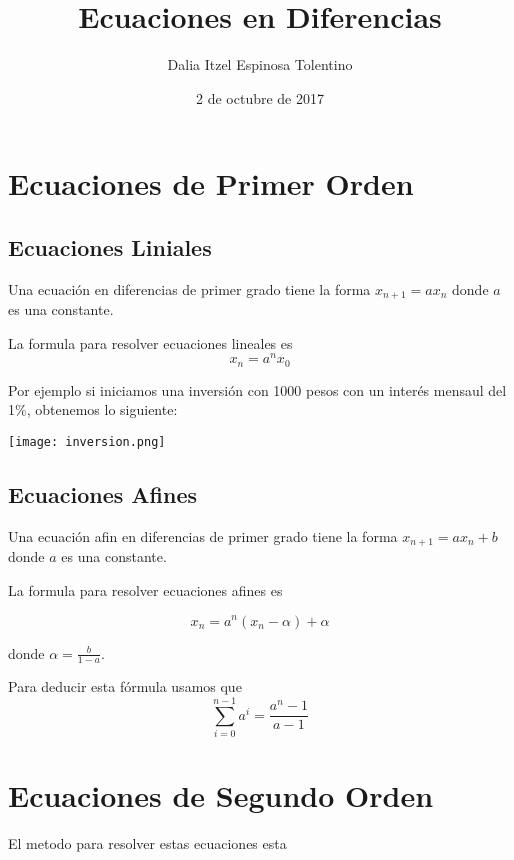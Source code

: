 \documentclass{article}
\title{Ecuaciones en Diferencias}
\author{Dalia Itzel Espinosa Tolentino}
\date{2 de octubre de 2017}
\begin{document}
\maketitle


\section{Ecuaciones de Primer Orden}

\subsection{Ecuaciones Liniales}

Una ecuación en diferencias de primer grado tiene la forma $x_{n+1}=ax_n$ donde $a$ es una constante.

La formula para resolver ecuaciones lineales es 
\begin{equation}
  \label{eq:eq2}
x_n=a^nx_0
\end{equation}

Por ejemplo si iniciamos una inversión con 1000 pesos con un interés mensaul del 1\%, obtenemos lo siguiente:

\begin{center}
  \texttt{[image: inversion.png]}
\end{center}


\subsection{Ecuaciones Afines}

Una ecuación afin en diferencias de primer grado tiene la forma $x_{n+1}=ax_n+b$ donde $a$ es una constante.

La formula para resolver ecuaciones afines es

\begin{equation}
  \label{eq:eq1}
  x_n=a^n(x_n-\alpha)+\alpha
\end{equation}

donde $\alpha=\frac{b}{1-a}$.

Para deducir esta fórmula usamos que $$\sum_{i=0}^{n-1}a^i=\frac{a^n-1}{a-1}$$

\section{Ecuaciones de Segundo Orden}
El metodo para resolver estas ecuaciones esta 
 
\end{document}
